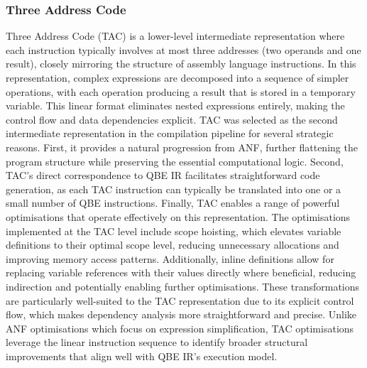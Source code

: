 \documentclass[final]{cmpreport_02}
\begin{document}
\subsubsection{Three Address Code}
Three Address Code (TAC) is a lower-level intermediate representation where each instruction typically involves at most three addresses (two operands and one result), closely mirroring the structure of assembly language instructions. In this representation, complex expressions are decomposed into a sequence of simpler operations, with each operation producing a result that is stored in a temporary variable. This linear format eliminates nested expressions entirely, making the control flow and data dependencies explicit.
TAC was selected as the second intermediate representation in the compilation pipeline for several strategic reasons. First, it provides a natural progression from ANF, further flattening the program structure while preserving the essential computational logic. Second, TAC's direct correspondence to QBE IR facilitates straightforward code generation, as each TAC instruction can typically be translated into one or a small number of QBE instructions. Finally, TAC enables a range of powerful optimisations that operate effectively on this representation.
The optimisations implemented at the TAC level include scope hoisting, which elevates variable definitions to their optimal scope level, reducing unnecessary allocations and improving memory access patterns. Additionally, inline definitions allow for replacing variable references with their values directly where beneficial, reducing indirection and potentially enabling further optimisations. These transformations are particularly well-suited to the TAC representation due to its explicit control flow, which makes dependency analysis more straightforward and precise. Unlike ANF optimisations which focus on expression simplification, TAC optimisations leverage the linear instruction sequence to identify broader structural improvements that align well with QBE IR's execution model.
\end{document}
